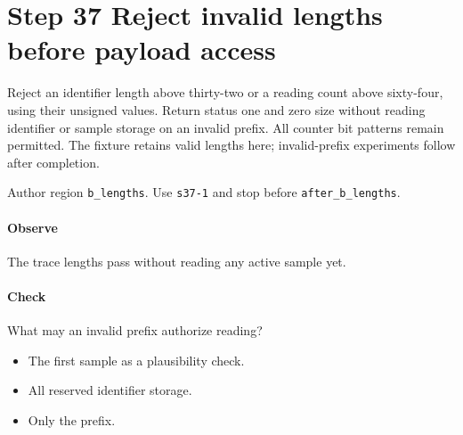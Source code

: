 \section{Step 37 Reject invalid lengths before payload access}\label{cbor-s37}
Reject an identifier length above thirty-two or a reading count above sixty-four, using their unsigned values. Return status one and zero size without reading identifier or sample storage on an invalid prefix. All counter bit patterns remain permitted. The fixture retains valid lengths here; invalid-prefix experiments follow after completion.

Author region \texttt{b\_lengths}. Use \texttt{s37-1} and stop before \texttt{after\_b\_lengths}.

\paragraph{Observe} The trace lengths pass without reading any active sample yet.

\paragraph{Check} What may an invalid prefix authorize reading?
\begin{itemize}
\item[A.] The first sample as a plausibility check.
\item[B.] All reserved identifier storage.
\item[C.] Only the prefix.
\end{itemize}
